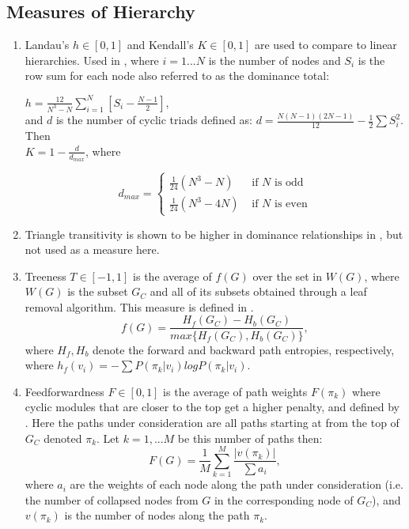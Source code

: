 \documentclass[3p,times]{elsarticle}
\begin{document}
\subsection{Measures of Hierarchy}
\begin{enumerate}
	\item Landau's $h\in[0,1]$ and Kendall's $K\in[0,1]$ are used to compare to linear hierarchies. Used in \cite{animals}, where $i=1...N$ is the number of nodes and $S_i$ is the row sum for each node also referred to as the dominance total: \\
	\begin{center}
		$h=\frac{12}{N^3-N}\sum_{i=1}^{N}{[S_i-\frac{N-1}{2}]}$, \\
		\vspace{5mm}
		and $d$ is the number of cyclic triads defined as: $d=\frac{N(N-1)(2N-1)}{12}-\frac{1}{2}\sum{S_i^2}$. Then 
		\\ \vspace{5mm}
		$K=1-\frac{d}{d_{max}}$, where 
		
		$$
		d_{max} = \left\{ \begin{array}{rl}
		\frac{1}{24}(N^3-N)&\mbox{ if $N$ is odd} \\
		\frac{1}{24}(N^3-4N)&\mbox{ if $N$ is even}
		\end{array} \right.
		$$
	\end{center} 
	
	\item Triangle transitivity is shown to be higher in dominance relationships in \cite{animals}, but not used as a measure here.
	
	\item Treeness $T\in[-1,1]$ is the average of $f(G)$ over the set in $W(G)$, where $W(G)$ is the subset $G_C$ and all of its subsets obtained through a leaf removal algorithm. This measure is defined in \cite{3D}.
	$$
	f(G)=\frac{H_f(G_C)-H_b(G_C)}{max\{H_f(G_C),H_b(G_C)\}},
	$$
	where $H_f, H_b$ denote the forward and backward path entropies, respectively, where $h_f(v_i)=-\sum{P(\pi_k|v_i)logP(\pi_k|v_i)}$.  
	
	\item Feedforwardness $F\in[0,1]$ is the average of path weights $F(\pi_k)$ where cyclic modules that are closer to the top get a higher penalty, and defined by \cite{3D}. Here the paths under consideration are all paths starting at from the top of $G_C$ denoted $\pi_k$. Let $k=1,...M$ be this number of paths then:
	$$
	F(G)=\frac{1}{M}\sum_{k=1}^{M}{\frac{|v(\pi_k)|}{\sum{a_i}}},
	$$
	where $a_i$ are the weights of each node along the path under consideration (i.e. the number of collapsed nodes from $G$ in the corresponding node of $G_C$), and $v(\pi_k)$ is the number of nodes along the path $\pi_k$.
	

\end{enumerate}
\end{document}
